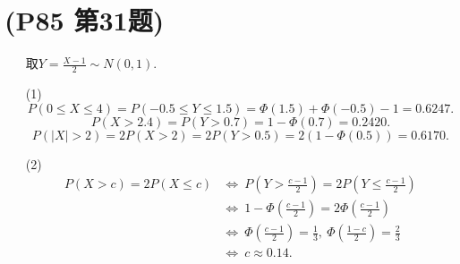 \documentclass{article}
\begin{document}
\section{(P85 第31题)}  %
\begin{enumerate}
    \item []取$Y=\frac{X-1}{2} \sim N(0,1)$.
    \item [(1)]
    \[
        P(0\leq X\leq 4)=
        P(-0.5 \leq Y\leq 1.5)=
        \Phi(1.5)+\Phi(-0.5)-1=
        0.6247.
    \]
    \vspace*{0.1cm}
    \[
        P(X>2.4)=
        P(Y>0.7)=
        1-\Phi(0.7)=
        0.2420.
    \]
    \vspace*{0.1cm}
    \[
        P(|X|>2)=
        2P(X>2)=
        2P(Y>0.5)=
        2(1-\Phi(0.5))=
        0.6170.    
    \]
    \item [(2)]
    \begin{align*}
        P(X>c)=2P(X\leq c)
        &\Leftrightarrow\ 
        P(Y>\frac{c-1}{2})=2P(Y\leq \frac{c-1}{2}) \\
        &\Leftrightarrow\ 
        1-\Phi(\frac{c-1}{2})=2\Phi(\frac{c-1}{2}) \\
        &\Leftrightarrow\ 
        \Phi(\frac{c-1}{2})=\frac{1}{3},\ \Phi(\frac{1-c}{2})=\frac{2}{3} \\
        &\Leftrightarrow\ 
        c\approx 0.14.
    \end{align*}
\end{enumerate}
\end{document}
